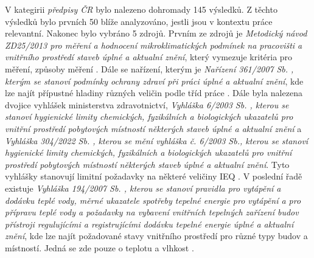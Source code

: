 V kategirii \textit{předpisy ČR} bylo nalezeno dohromady 145 výsledků. Z těchto výsledků bylo prvních 50 blíže analyzováno, jestli jsou v kontextu práce relevantní. Nakonec bylo vybráno 5 zdrojů.
 Prvním ze zdrojů je \textit{Metodický návod ZD25/2013 pro měření a hodnocení mikroklimatických podmínek na pracovišti a vnitřního prostředí staveb úplné a aktualní znění}, který vymezuje kritéria pro měření, způsoby měření \parencite{wolterskluwerMetodickyNavodZD252013}. 
Dále se nařízení, kterým je \textit{Nařízení 361/2007 Sb. , kterým se stanoví podmínky ochrany zdraví při práci úplné a aktualní znění}, kde lze najít přípustné hladiny různých veličin podle tříd práce \parencite{wolterskluwerNarizeni36120072007}.
Dále byla nalezena dvojice vyhlášek ministerstva zdravotnictví, \textit{Vyhláška 6/2003 Sb. , kterou se stanoví hygienické limity chemických, fyzikálních a biologických ukazatelů pro vnitřní prostředí pobytových místností některých staveb úplné a aktualní znění} a \textit{Vyhláška 304/2022 Sb. , kterou se mění vyhláška č. 6/2003 Sb., kterou se stanoví hygienické limity chemických, fyzikálních a biologických ukazatelů pro vnitřní prostředí pobytových místností některých staveb úplné a aktualní znění}. Tyto vyhlášky stanovují limitní požadavky na některé veličiny IEQ  \parencite{wolterskluwerVyhlaska620032003,wolterskluwerVyhlaska30420222022}.
V poslední řadě existuje \textit{Vyhláška 194/2007 Sb. , kterou se stanoví pravidla pro vytápění a dodávku teplé vody, měrné ukazatele spotřeby tepelné energie pro vytápění a pro přípravu teplé vody a požadavky na vybavení vnitřních tepelných zařízení budov přístroji regulujícími a registrujícími dodávku tepelné energie úplné a aktualní znění}, kde lze najít požadované stavy vnitřního prostředí pro různé typy budov a místností. Jedná se zde pouze o teplotu a vlhkost \parencite{wolterskluwerVyhlaska19420072007}.

